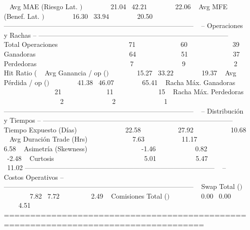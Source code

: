   Avg MAE (Riesgo Lat. $)     $          21.04  $          42.21  $          22.06
  Avg MFE (Benef. Lat. $)     $          16.30  $          33.94  $          20.50
------------------------------------------------------------------------------------
  -- Operaciones y Rachas --
------------------------------------------------------------------------------------
  Total Operaciones                         71                60                39
  Ganadoras                                 64                51                37
  Perdedoras                                 7                 9                 2
  Hit Ratio (%
  Avg Ganancia / op ($)       $          15.27  $          33.22  $          19.37
  Avg Pérdida / op ($)        $          41.38  $          46.07  $          65.41
  Racha Máx. Ganadoras                      21                11                15
  Racha Máx. Perdedoras                      2                 2                 1
------------------------------------------------------------------------------------
  -- Distribución y Tiempos --
------------------------------------------------------------------------------------
  Tiempo Expuesto (Días)                 22.58             27.92             10.68
  Avg Duración Trade (Hrs)                7.63             11.17              6.58
  Asimetría (Skewness)                   -1.46              0.82             -2.48
  Curtosis                                5.01              5.47             11.02
------------------------------------------------------------------------------------
  -- Costos Operativos --
------------------------------------------------------------------------------------
  Swap Total ($)              $           7.82  $           7.72  $           2.49
  Comisiones Total ($)        $           0.00  $           0.00  $           4.51
====================================================================================


